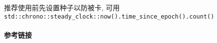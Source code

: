 推荐使用前先设置种子以防被卡, 可用\\\verb|std::chrono::steady_clock::now().time_since_epoch().count()|

\paragraph{参考链接}

